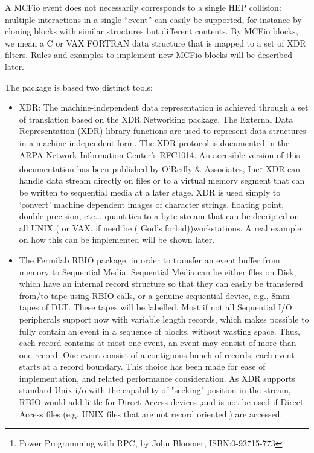 	A MCFio event does not necessarily corresponds to a single HEP 
collision:  multiple interactions in a single ``event'' can easily be 
supported, for instance by cloning blocks with similar structures but 
different contents. By MCFio blocks, we mean a C or VAX FORTRAN data 
structure that is mapped to a set of XDR filters. Rules and examples to 
implement new MCFio blocks will be described later.   

	The package is based two distinct tools: 
	
\begin{itemize}
\item	XDR: The machine-independent data representation is  achieved through a
set of translation based on the XDR Networking package. The External Data
Representation (XDR) library functions are used to represent data structures
in a machine independent form. The XDR protocol is documented in the 
ARPA Network Information Center's RFC1014. An accesible version of this 
documentation has been published by O'Reilly \& Associates, Inc\footnote{Power
Programming with RPC, by John Bloomer, ISBN:0-93715-773}
   XDR can handle data
stream directly on files or to a virtual memory  segment that can be written to
sequential media at a later stage. XDR is used simply to `convert' machine
dependent images of character strings, floating  point, double precision,
etc... quantities to a byte stream that can be decripted on all UNIX ( or VAX,
if need be ( God's forbid))workstations.  A real  example on how this can be
implemented will be shown later. 
\item  The Fermilab RBIO package, in order to transfer an event  buffer from
memory to Sequential Media. Sequential Media can be either files on Disk, 
which have an internal record structure so that they can easily be transfered 
from/to tape using RBIO calls, or a genuine sequential device, e.g., 
8mm tapes of DLT.  These tapes will be labelled.  Most if not all
Sequential I/O peripherals support now with variable length records,  which
makes possible to fully contain an event in a sequence of blocks,  without
wasting space. Thus, each record contains at most one event, an  event may
consist of more than one record. One event consist of a contiguous bunch of
records, each event starts  at a record boundary. This choice has been made for
ease of implementation, and related performance consideration.  As XDR supports
standard Unix i/o  with the capability of "seeking" position in the stream,
RBIO would add little  for Direct Access devices ,and is not be used if Direct 
Access files (e.g. UNIX files that are not record oriented.) are accessed.
\end{itemize}

